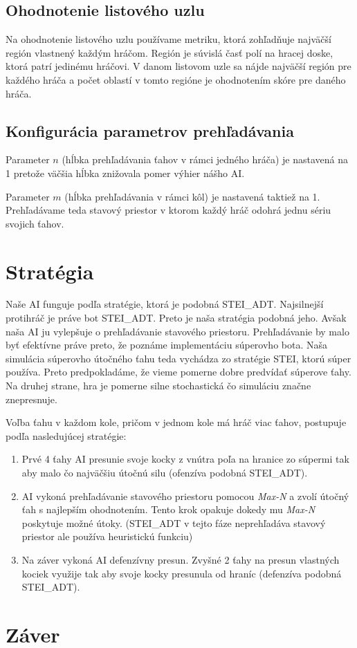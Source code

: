 \documentclass[a4paper, 11pt]{article}
\begin{document}
\subsection{Ohodnotenie listového uzlu}
Na ohodnotenie listového uzlu používame metriku, ktorá zohľadňuje najväčší región vlastnený každým hráčom. Región je súvislá časť polí na hracej doske, ktorá patrí jedinému hráčovi. V danom listovom uzle sa nájde najväčší región pre každého hráča a počet oblastí v tomto regióne je ohodnotením skóre pre daného hráča.

\subsection{Konfigurácia parametrov prehľadávania}
Parameter $n$ (hĺbka prehľadávania ťahov v rámci jedného hráča) je nastavená na 1 pretože väčšia hĺbka znižovala pomer výhier nášho AI. 

Parameter $m$ (hĺbka prehľadávania v rámci kôl) je nastavená taktiež na 1. Prehľadávame teda stavový priestor v ktorom každý hráč odohrá jednu sériu svojich ťahov.

\section{Stratégia}
Naše AI funguje podľa stratégie, ktorá je podobná STEI\_ADT. Najsilnejší protihráč je práve bot STEI\_ADT. Preto je naša stratégia podobná jeho. Avšak naša AI ju vylepšuje o prehľadávanie stavového priestoru. Prehľadávanie by malo byť efektívne práve preto, že poznáme implementáciu súperovho bota. Naša simulácia súperovho útočného ťahu teda vychádza zo stratégie STEI, ktorú súper používa. Preto predpokladáme, že vieme pomerne dobre predvídať súperove ťahy. Na druhej strane, hra je pomerne silne stochastická čo simuláciu značne znepresnuje.

Voľba ťahu v každom kole, pričom v jednom kole má hráč viac ťahov, postupuje podľa nasledujúcej stratégie:
\begin{enumerate}
	\item Prvé 4 ťahy AI presunie svoje kocky z vnútra poľa na hranice zo súpermi tak aby malo čo najväčšiu útočnú silu (ofenzíva podobná STEI\_ADT).
	\item AI vykoná prehľadávanie stavového priestoru pomocou \textit{Max-N} a zvolí útočný ťah s najlepším ohodnotením. Tento krok opakuje dokedy mu \textit{Max-N} poskytuje možné útoky. (STEI\_ADT v tejto fáze neprehľadáva stavový priestor ale používa heuristickú funkciu)
	\item Na záver vykoná AI defenzívny presun. Zvyšné 2 ťahy na presun vlastných kociek využije tak aby svoje kocky presunula od hraníc (defenzíva podobná STEI\_ADT).
\end{enumerate}


\section{Záver}
\end{document}
